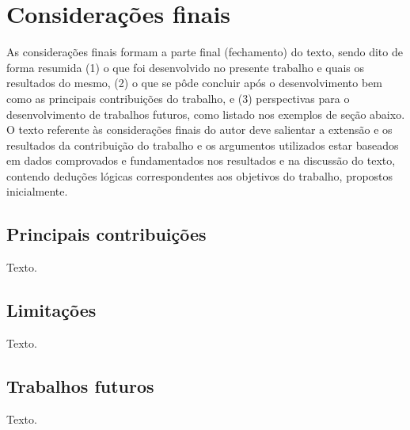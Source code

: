 \chapter{Considerações finais}

As considerações finais formam a parte final (fechamento) do texto, sendo dito
de forma resumida (1) o que foi desenvolvido no presente trabalho e quais os
resultados do mesmo, (2) o que se pôde concluir após o desenvolvimento bem como
as principais contribuições do trabalho, e (3) perspectivas para o
desenvolvimento de trabalhos futuros, como listado nos exemplos de seção abaixo.
O texto referente às considerações finais do autor deve salientar a extensão e
os resultados da contribuição do trabalho e os argumentos utilizados estar
baseados em dados comprovados e fundamentados nos resultados e na discussão do
texto, contendo deduções lógicas correspondentes aos objetivos do trabalho,
propostos inicialmente.


\section{Principais contribuições}

Texto.


\section{Limitações}

Texto.


\section{Trabalhos futuros}

Texto.
